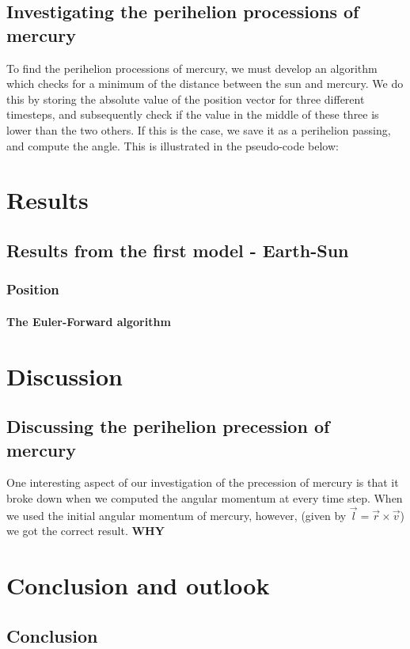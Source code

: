 \documentclass[a4paper, 10pt]{article}
\begin{document}
\subsection{Investigating the perihelion processions of mercury}
To find the perihelion processions of mercury, we must develop an algorithm which checks for a minimum of the distance between the sun and mercury. We do this by storing the absolute value of the position vector for three different timesteps, and subsequently check if the value in the middle of these three is lower than the two others. If this is the case, we save it as a perihelion passing, and compute the angle. This is illustrated in the pseudo-code below:


\section{Results}
\subsection{Results from the first model - Earth-Sun}
\subsubsection{Position}
\paragraph{The Euler-Forward algorithm}
\section{Discussion}
\subsection{Discussing the perihelion precession of mercury}
One interesting aspect of our investigation of the precession of mercury is that it broke down when we computed the angular momentum at every time step. When we used the initial angular momentum of mercury, however, (given by $\vec{l}=\vec{r}\times \vec{v}$) we got the correct result. \textbf{WHY}
\section{Conclusion and outlook}
\subsection{Conclusion}
\end{document}
